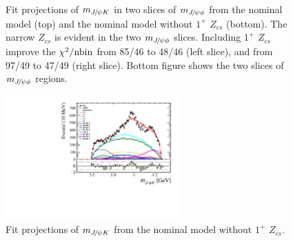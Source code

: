 \begin{figure}[!tbp]
\caption{Fit projections of $m_{{{J\mskip -3mu/\mskip -2mu\psi}} K}$ in two slices of $m_{{{J\mskip -3mu/\mskip -2mu\psi}} \phi}$ from the nominal model (top) and the nominal model without $1^+$ $Z_{cs}$ (bottom). 
The narrow $Z_{cs}$ is evident in the two $m_{{{J\mskip -3mu/\mskip -2mu\psi}} \phi}$ slices.  
Including $1^+$ $Z_{cs}$ improve the $\chi^2/{\rm nbin}$ from 85/46 to 48/46 (left slice), 
and from 97/49 to 47/49 (right slice). 
Bottom figure shows the two slices of $m_{{{J\mskip -3mu/\mskip -2mu\psi}} \phi}$ regions.}
\label{fig:fitmjpsik}
\end{figure}

\begin{figure}[!tbp]
\centering
\includegraphics[width=0.6\textwidth]{Figures/03_Zcs/06_Amplitude/fit0/mjpsik-NoZ}%
\caption{Fit projections of $m_{{{J\mskip -3mu/\mskip -2mu\psi}} K}$ from the nominal model without $1^+$ $Z_{cs}$. }
\label{fig:fitmjpsik-noz}
\end{figure}

